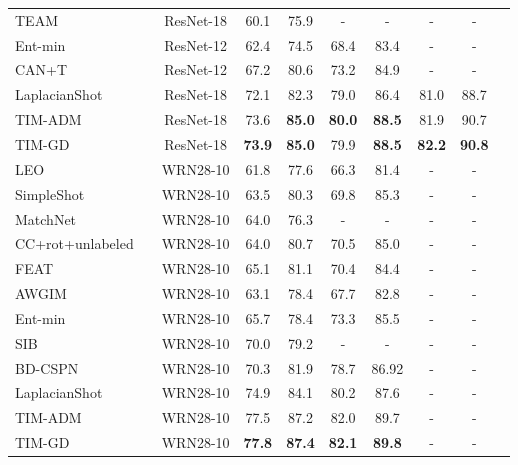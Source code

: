 \documentclass{article}
\newcommand{\cmark}{\ding{51}}\newcommand{\xmark}{\ding{55}}\newcommand{\CC}{\mathcal{C}}
\begin{document}
\begin{table}
\begin{tabular}{lccccccccc}
             TEAM \cite{team}& & ResNet-18 & 60.1 & 75.9 & - & - & - & -\\
             Ent-min \cite{dhillon2019baseline}& & ResNet-12 & 62.4 & 74.5 & 68.4 & 83.4 & - & -\\
             CAN+T \cite{can}& & ResNet-12 & 67.2 & 80.6 & 73.2 & 84.9 & - & -\\
             LaplacianShot \cite{Laplacian}& & ResNet-18 & 72.1 & 82.3 & 79.0 & 86.4 & 81.0 & 88.7 \\
             \rowcolor{Gray} TIM-ADM & & ResNet-18 & 73.6 & \textbf{85.0} & \textbf{80.0} & \textbf{88.5} & 81.9 & 90.7 \\
             \rowcolor{Gray} TIM-GD & \multirow{-10}{*}{\cmark} & ResNet-18 & \textbf{73.9} & \textbf{85.0} & 79.9 & \textbf{88.5} & \textbf{82.2} & \textbf{90.8} \\
             \toprule
             LEO \cite{leo}& \multirow{5}{*}{\xmark} & WRN28-10 & 61.8 & 77.6 & 66.3 & 81.4 & - & -\\
             SimpleShot \cite{simpleshot}& & WRN28-10 & 63.5 & 80.3 & 69.8 & 85.3 & - & -\\
             MatchNet \cite{matching_net}& & WRN28-10 & 64.0 & 76.3 & - & - & - & -\\
             CC+rot+unlabeled \cite{gidaris2019boosting} & & WRN28-10 & 64.0 & 80.7 & 70.5 & 85.0 & - & -\\
             FEAT \cite{feat} & & WRN28-10 & 65.1 & 81.1 & 70.4 & 84.4 & - & -\\
             \midrule
             AWGIM \cite{guo2020attentive}&  & WRN28-10 & 63.1 & 78.4 & 67.7 & 82.8 & - & -\\
             Ent-min \cite{dhillon2019baseline} &  & WRN28-10 & 65.7 & 78.4 & 73.3 & 85.5 & - & -\\
             SIB  \cite{hu2020empirical} &  & WRN28-10 & 70.0 & 79.2 & - & - & - & -\\
             BD-CSPN \cite{prototype}&  & WRN28-10 & 70.3 & 81.9 & 78.7 & 86.92 & - & -\\
             LaplacianShot  \cite{Laplacian} &  & WRN28-10 & 74.9 & 84.1 & 80.2 & 87.6 & - & -\\
             \rowcolor{Gray} TIM-ADM & & WRN28-10 & 77.5 & 87.2 & 82.0 & 89.7 & - & -\\
             \rowcolor{Gray} TIM-GD & \multirow{-7}{*}{\cmark} & WRN28-10 & \textbf{77.8} & \textbf{87.4} & \textbf{82.1} & \textbf{89.8} & - & -\\
\bottomrule
        \end{tabular}
        \label{tab:benchmark_results}
        \end{table}
        
\end{document}
